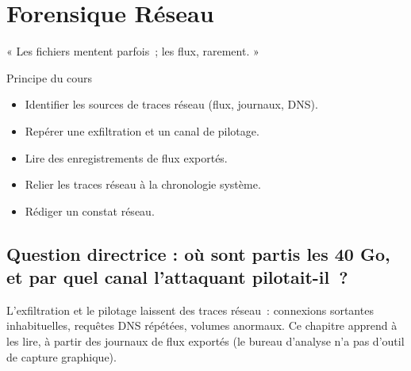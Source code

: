 
\chapter{Forensique Réseau}
\label{chap:reseau}

\epigraph{%
    « Les fichiers mentent parfois~; les flux, rarement. »%
}{Principe du cours}


\begin{boxobjectifs}
\begin{itemize}
    \item Identifier les sources de traces réseau (flux, journaux, DNS).
    \item Repérer une exfiltration et un canal de pilotage.
    \item Lire des enregistrements de flux exportés.
    \item Relier les traces réseau à la chronologie système.
    \item Rédiger un constat réseau.
\end{itemize}
\end{boxobjectifs}

\bigskip

\section*{Question directrice : où sont partis les 40 Go, et par quel canal l'attaquant pilotait-il~?}

L'exfiltration et le pilotage laissent des traces réseau~: connexions
sortantes inhabituelles, requêtes DNS répétées, volumes anormaux. Ce chapitre
apprend à les lire, à partir des journaux de flux exportés (le bureau
d'analyse n'a pas d'outil de capture graphique).


